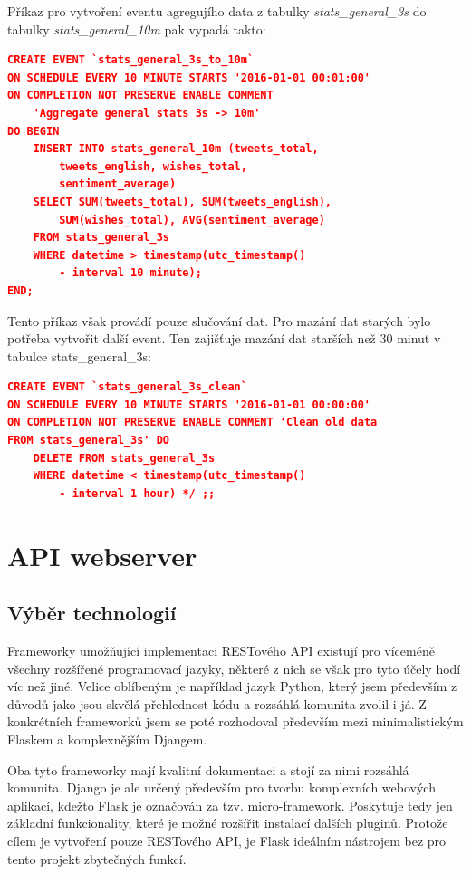 \documentclass[thesis=B,czech]{FITthesis}[2012/06/26]
\begin{document}
	Příkaz pro vytvoření eventu agregujího data z tabulky \textit{stats\_general\_3s} do tabulky \textit{stats\_general\_10m }pak vypadá takto:
	
\begin{lstlisting}[language=json,firstnumber=1]
CREATE EVENT `stats_general_3s_to_10m` 
ON SCHEDULE EVERY 10 MINUTE STARTS '2016-01-01 00:01:00' 
ON COMPLETION NOT PRESERVE ENABLE COMMENT 
	'Aggregate general stats 3s -> 10m' 
DO BEGIN 
	INSERT INTO stats_general_10m (tweets_total, 
		tweets_english, wishes_total, 
		sentiment_average) 
	SELECT SUM(tweets_total), SUM(tweets_english), 
		SUM(wishes_total), AVG(sentiment_average) 
	FROM stats_general_3s 
	WHERE datetime > timestamp(utc_timestamp() 
		- interval 10 minute); 
END;
\end{lstlisting}

Tento příkaz však provádí pouze slučování dat. Pro mazání dat starých bylo potřeba vytvořit další event. Ten zajišťuje mazání dat starších než 30 minut v tabulce stats\_general\_3s:

\begin{lstlisting}[language=json,firstnumber=1]
CREATE EVENT `stats_general_3s_clean` 
ON SCHEDULE EVERY 10 MINUTE STARTS '2016-01-01 00:00:00' 
ON COMPLETION NOT PRESERVE ENABLE COMMENT 'Clean old data 
FROM stats_general_3s' DO 
	DELETE FROM stats_general_3s
	WHERE datetime < timestamp(utc_timestamp() 
		- interval 1 hour) */ ;;
\end{lstlisting}

\section{API webserver}
\subsection{Výběr technologií}
	Frameworky umožňující implementaci RESTového API existují pro víceméně všechny rozšířené programovací jazyky, některé z nich se však pro tyto účely hodí víc než jiné. Velice oblíbeným je například jazyk Python, který jsem především z důvodů jako jsou skvělá přehlednost kódu a rozsáhlá komunita zvolil i já. Z konkrétních frameworků jsem se poté rozhodoval především mezi minimalistickým Flaskem a komplexnějším Djangem. 
	
	Oba tyto frameworky mají kvalitní dokumentaci a stojí za nimi rozsáhlá komunita. Django je ale určený především pro tvorbu komplexních webových aplikací, kdežto Flask je označován za tzv. micro-framework. Poskytuje tedy jen základní funkcionality, které je možné rozšířit instalací dalších pluginů. Protože cílem je vytvoření pouze RESTového API, je Flask ideálním nástrojem bez pro tento projekt zbytečných funkcí. 
	
\end{document}
